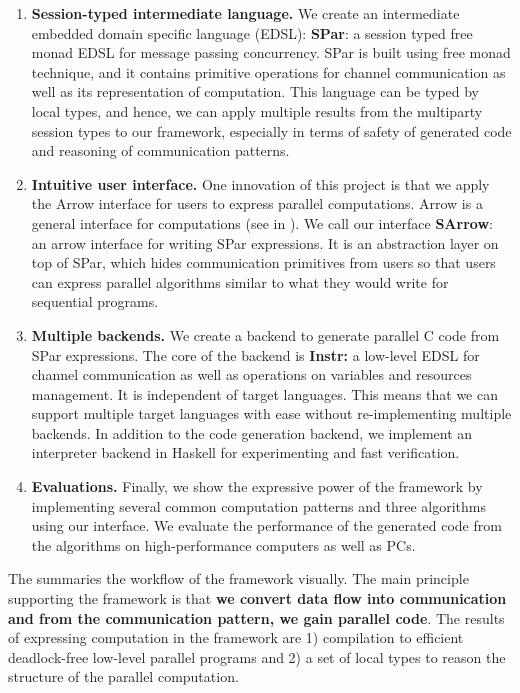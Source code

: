 \begin{enumerate}
    \item \textbf{Session-typed intermediate language. } We create an intermediate embedded domain specific language (EDSL): \textbf{SPar}: a session typed free monad EDSL for message passing concurrency. SPar is built using free monad technique, and it contains primitive operations for channel communication as well as its representation of computation. This language can be typed by local types, and hence, we can apply multiple results from the multiparty session types to our framework, especially in terms of safety of generated code and reasoning of communication patterns.
    \item \textbf{Intuitive user interface. } One innovation of this project is that we apply the Arrow interface for users to express parallel computations. Arrow is a general interface for computations (see in ). We call our interface \textbf{SArrow}: an arrow interface for writing SPar expressions. It is an abstraction layer on top of SPar, which hides communication primitives from users so that users can express parallel algorithms similar to what they would write for sequential programs.
    \item \textbf{Multiple backends. } We create a backend to generate parallel C code from SPar expressions. The core of the backend is \textbf{Instr:} a low-level EDSL for channel communication as well as operations on variables and resources management. It is independent of target languages. This means that we can support multiple target languages with ease without re-implementing multiple backends. In addition to the code generation backend, we implement an interpreter backend in Haskell for experimenting and fast verification.
    \item \textbf{Evaluations. } Finally, we show the expressive power of the framework by implementing several common computation patterns and three algorithms using our interface. We evaluate the performance of the generated code from the algorithms on high-performance computers as well as PCs. 
\end{enumerate}
The  summaries the workflow of the framework visually. The main principle supporting the framework is that \textbf{we convert data flow into communication and from the communication pattern, we gain parallel code}. The results of expressing computation in the framework are 1) compilation to efficient deadlock-free low-level parallel programs and 2) a set of local types to reason the structure of the parallel computation.


